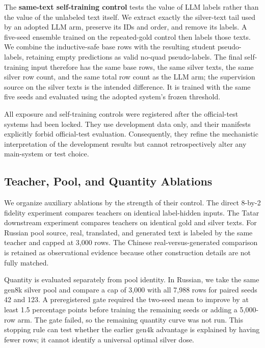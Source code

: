The \textbf{same-text self-training control} tests the value of LLM
labels rather than the value of the unlabeled text itself. We extract
exactly the silver-text tail used by an adopted LLM arm, preserve its
IDs and order, and remove its labels. A five-seed ensemble trained on
the repeated-gold control then labels those texts. We combine the
inductive-safe base rows with the resulting student pseudo-labels,
retaining empty predictions as valid no-quad pseudo-labels. The final
self-training input therefore has the same base rows, the same silver
texts, the same silver row count, and the same total row count as the
LLM arm; the supervision source on the silver texts is the intended
difference. It is trained with the same five seeds and evaluated using
the adopted system's frozen threshold.

All exposure and self-training controls were registered after the
official-test systems had been locked. They use development data only,
and their manifests explicitly forbid official-test evaluation.
Consequently, they refine the mechanistic interpretation of the
development results but cannot retrospectively alter any main-system or
test choice.

\subsection{Teacher, Pool, and Quantity
Ablations}\label{teacher-pool-and-quantity-ablations}

We organize auxiliary ablations by the strength of their control. The
direct 8-by-2 fidelity experiment compares teachers on identical
label-hidden inputs. The Tatar downstream experiment compares teachers
on identical gold and silver texts. For Russian pool source, real,
translated, and generated text is labeled by the same teacher and capped
at 3,000 rows. The Chinese real-versus-generated comparison is retained
as observational evidence because other construction details are not
fully matched.

Quantity is evaluated separately from pool identity. In Russian, we take
the same gen8k silver pool and compare a cap of 3,000 with all 7,988
rows for paired seeds 42 and 123. A preregistered gate required the
two-seed mean to improve by at least 1.5 percentage points before
training the remaining seeds or adding a 5,000-row arm. The gate failed,
so the remaining quantity curve was not run. This stopping rule can test
whether the earlier gen4k advantage is explained by having fewer rows;
it cannot identify a universal optimal silver dose.

